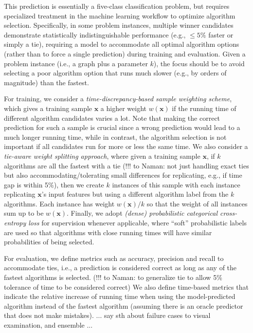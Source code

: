 \documentclass[sigconf,anonymous,review]{acmart}
\begin{document}
This prediction is essentially a five-class classification problem, but requires specialized treatment in the machine learning workflow to optimize algorithm selection. Specifically, in some problem instances, multiple winner candidates demonstrate statistically indistinguishable performance (e.g., $\leq 5\%$ faster or simply a tie), requiring a model to accommodate all optimal algorithm options (rather than to force a single prediction) during training and evaluation. Given a problem instance (i.e., a graph plus a parameter $k$), the focus should be to avoid selecting a poor algorithm option that runs much slower (e.g., by orders of magnitude) than the fastest. 

For training, we consider a {\em time-discrepancy-based sample weighting scheme}, which gives a training sample $\mathbf{x}$ a higher weight $w(\mathbf{x})$ if the running time of different algorithm candidates varies a lot. Note that making the correct prediction for such a sample is crucial since a wrong prediction would lead to a much longer running time, while in contrast, the algorithm selection is not important if all candidates run for more or less the same time. 
%
We also consider a {\em tie-aware weight splitting approach}, where given a training sample $\mathbf{x}$, if $k$ algorithms are all the fastest with a tie {\color{red} (!!! to Naman: not just handling exact ties but also accommodating/tolerating small differences for replicating, e.g., if time gap is within 5\%)}, 
%
then we create $k$ instances of this sample with each instance replicating $\mathbf{x}$'s input features but using a different algorithm label from the $k$ algorithms. Each instance has weight $w(\mathbf{x})/k$ so that the weight of all instances sum up to be $w(\mathbf{x})$. Finally, we adopt {\em (dense) probabilistic categorical cross-entropy loss} for supervision whenever applicable, where ``soft'' probabilistic labels are used so that algorithms with close running times will have similar probabilities of being selected. 

For evaluation, we define metrics such as accuracy, precision and recall to accommodate ties, i.e., a prediction is considered correct as long as any of the fastest algorithms is selected. 
%
{\color{red} (!!! to Naman: to generalize tie to allow 5\% tolerance of time to be considered correct)} 
%
We also define time-based metrics that indicate the relative increase of running time when using the model-predicted algorithm instead of the fastest algorithm (assuming there is an oracle predictor that does not make mistakes). 
%
{\color{red}... say sth about failure cases to visual examination, and ensemble ...}
\end{document}
